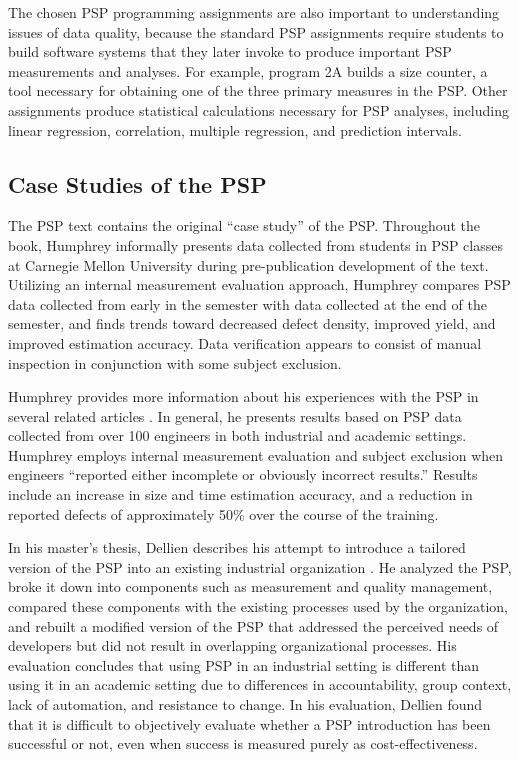 The chosen PSP programming assignments are also important to
understanding issues of data quality, because the standard PSP assignments
require students to build software systems that they later invoke to
produce important PSP measurements and analyses.  For example, program 2A
builds a size counter, a tool necessary for obtaining one of the three
primary measures in the PSP. Other assignments produce statistical
calculations necessary for PSP analyses, including linear regression,
correlation, multiple regression, and prediction intervals.


\subsection{Case Studies of the PSP}

The PSP text contains the original ``case study'' of the PSP. Throughout
the book, Humphrey informally presents data collected from students in PSP
classes at Carnegie Mellon University during pre-publication development of
the text. Utilizing an internal measurement evaluation approach, Humphrey
compares PSP data collected from early in the semester with data collected
at the end of the semester, and finds trends toward decreased defect
density, improved yield, and improved estimation accuracy.  Data
verification appears to consist of manual inspection in conjunction with
some subject exclusion.  

Humphrey provides more information about his experiences with the
PSP in several related articles
\cite{Humphrey94,Humphrey94a,Humphrey95a,Humphrey95b,Humphrey96}.  In
general, he presents results based on PSP data collected from over 100
engineers in both industrial and academic settings.  Humphrey employs
internal measurement evaluation and subject exclusion when engineers
``reported either incomplete or obviously incorrect results.''  Results
include an increase in size and time estimation accuracy, and a
reduction in reported
defects of approximately 50\% over the course of the training.

In his master's thesis, Dellien describes his attempt to introduce a
tailored version of the PSP into an existing industrial organization
\cite{Dellien97}.  He analyzed the PSP, broke it down into components such
as measurement and quality management, compared these components with the
existing processes used by the organization, and rebuilt a modified version
of the PSP that addressed the perceived needs of developers but did not
result in overlapping organizational processes.  His evaluation concludes
that using PSP in an industrial setting is different than using it in an
academic setting due to differences in accountability, group context, lack
of automation, and resistance to change.  In his evaluation, Dellien found
that it is difficult to objectively evaluate whether a PSP introduction has
been successful or not, even when success is measured purely as
cost-effectiveness.

